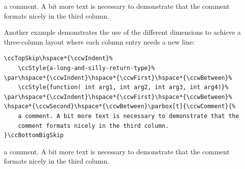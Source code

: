 \documentclass[11pt]{article}
\begin{document}
\ccInitFunctionWidths
\ccTopSkip\hspace*{\ccwIndent}\parbox[t]{\ccwFirst}{%
}\hspace*{\ccwBetween}\parbox[t]{\ccwSecond}{%
}\hspace*{\ccwBetween}\parbox[t]{\ccwComment}{%
    a comment. A bit more text is necessary to demonstrate that the
    comment formats nicely in the third column.
}\ccBottomSkip

Another example demonstrates the use of the different dimensions to
achieve a three-column layout where each column entry needs a new
line:

\begin{verbatim}
\ccTopSkip\hspace*{\ccwIndent}%
    \ccStyle{a-long-and-silly-return-type}%
\par\hspace*{\ccwIndent}\hspace*{\ccwFirst}\hspace*{\ccwBetween}%
    \ccStyle{function( int arg1, int arg2, int arg3, int arg4)}%
\par\hspace*{\ccwIndent}\hspace*{\ccwFirst}\hspace*{\ccwBetween}%
\hspace*{\ccwSecond}\hspace*{\ccwBetween}\parbox[t]{\ccwComment}{%
    a comment. A bit more text is necessary to demonstrate that the
    comment formats nicely in the third column.
}\ccBottomBigSkip
\end{verbatim}

\ccTopSkip\hspace*{\ccwIndent}%
\par\hspace*{\ccwIndent}\hspace*{\ccwFirst}\hspace*{\ccwBetween}%
\par\hspace*{\ccwIndent}\hspace*{\ccwFirst}\hspace*{\ccwBetween}%
\hspace*{\ccwSecond}\hspace*{\ccwBetween}\parbox[t]{\ccwComment}{%
    a comment. A bit more text is necessary to demonstrate that the
    comment formats nicely in the third column.
}\ccBottomBigSkip
\end{document}
